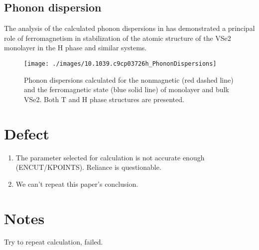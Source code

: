 \subsection{Phonon dispersion}
The analysis of the calculated phonon dispersions in  has demonstrated a principal role of ferromagnetism in stabilization of the atomic structure of the VSe2 monolayer in the H phase and similar systems.
\begin{figure}[ht] 
    \texttt{[image: ./images/10.1039.c9cp03726h\_PhononDispersions]}
	\caption[Phonon dispersions calculated for the nonmagnetic and the ferromagnetic state of monolayer and bulk VSe2.]{
		Phonon dispersions calculated for the nonmagnetic (red dashed line) and the ferromagnetic state (blue solid line) of monolayer and bulk VSe2. Both T and H phase structures are presented.
	}
\end{figure}
\section{Defect}
\begin{enumerate}
    \item The parameter selected for calculation is not accurate enough (ENCUT/KPOINTS). Reliance is questionable.
    \item We can't repeat this paper's conclusion.
\end{enumerate}

\section{Notes}
Try to repeat calculation, failed.